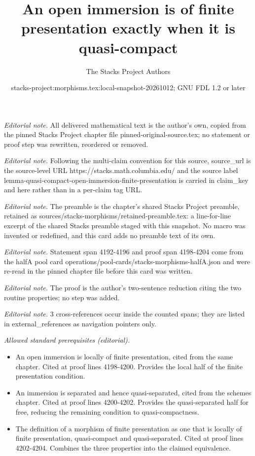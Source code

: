 \documentclass[10pt,a4paper]{amsart}
\title{An open immersion is of finite presentation exactly when it is quasi-compact}
\author{The Stacks Project Authors}
\date{stacks-project:morphisms.tex:local-snapshot-20261012; GNU FDL 1.2 or later}
\theoremstyle{plain}
\theoremstyle{definition}
\theoremstyle{remark}
\numberwithin{equation}{subsection}
\begin{document}
\maketitle
\noindent\textit{Editorial note.} All delivered mathematical text is the author's own, copied from the pinned Stacks Project chapter file pinned-original-source.tex; no statement or proof step was rewritten, reordered or removed.\par\medskip
\noindent\textit{Editorial note.} Following the multi-claim convention for this source, source\_url is the source-level URL https://stacks.math.columbia.edu/ and the source label lemma-quasi-compact-open-immersion-finite-presentation is carried in claim\_key and here rather than in a per-claim tag URL.\par\medskip
\noindent\textit{Editorial note.} The preamble is the chapter's shared Stacks Project preamble, retained as sources/stacks-morphisms/retained-preamble.tex: a line-for-line excerpt of the shared Stacks preamble staged with this snapshot. No macro was invented or redefined, and this card adds no preamble text of its own.\par\medskip
\noindent\textit{Editorial note.} Statement span 4192-4196 and proof span 4198-4204 come from the halfA pool card operations/pool-cards/stacks-morphisms-halfA.json and were re-read in the pinned chapter file before this card was written.\par\medskip
\noindent\textit{Editorial note.} The proof is the author's two-sentence reduction citing the two routine properties; no step was added.\par\medskip
\noindent\textit{Editorial note.} 3 cross-references occur inside the counted spans; they are listed in external\_references as navigation pointers only.\par\medskip
\noindent\textit{Allowed standard prerequisites (editorial).}\begin{itemize}
\item An open immersion is locally of finite presentation, cited from the same chapter. Cited at proof lines 4198-4200. Provides the local half of the finite presentation condition.
\item An immersion is separated and hence quasi-separated, cited from the schemes chapter. Cited at proof lines 4200-4202. Provides the quasi-separated half for free, reducing the remaining condition to quasi-compactness.
\item The definition of a morphism of finite presentation as one that is locally of finite presentation, quasi-compact and quasi-separated. Cited at proof lines 4202-4204. Combines the three properties into the claimed equivalence.
\end{itemize}\medskip
\end{document}
